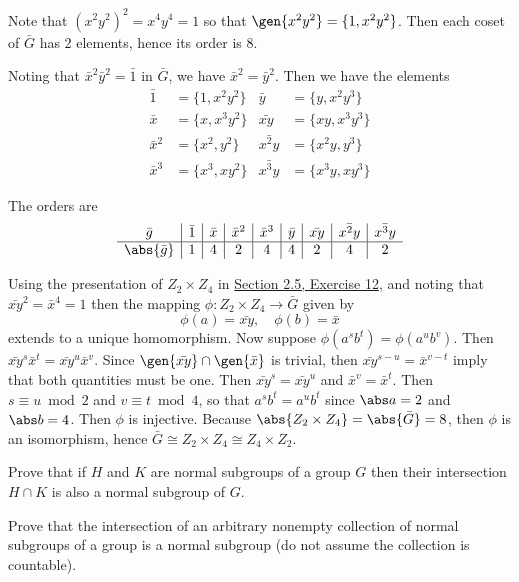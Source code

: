 \begin{solalph}
    \item Note that $(x^2y^2)^2 = x^4y^4 = 1$ so that $\gen{x^2y^2} = \{1, x^2y^2\}$. Then each coset of $\bar G$ has 2 elements, hence its order is 8.
    \item Noting that $\bar x^2 \bar y^2 = \bar 1$ in $\bar G$, we have $\bar x^2 = \bar y^2$. Then we have the elements
    \begin{align*}
        \bar 1 & = \{1, x^2y^2\} & \bar y & = \{y, x^2y^3\} \\
        \bar x & = \{x, x^3y^2\} & \bar{xy} & = \{xy, x^3y^3\} \\
        \bar x^2 & = \{x^2, y^2\} & \bar{x^2y} & = \{x^2y, y^3\} \\
        \bar x^3 & = \{x^3, xy^2\} & \bar{x^3y} & = \{x^3y, xy^3\}
    \end{align*}
    \item The orders are
    \[
    \begin{array}{c|c|c|c|c|c|c|c|c}
        \bar g & \bar 1 & \bar x & \bar x^2 & \bar x^3 & \bar y & \bar{xy} & \bar{x^2y} & \bar{x^3y} \\
        \hline
        \abs{\bar g} & 1 & 4 & 2 & 4 & 4 & 2 & 4 & 2
    \end{array}
    \]
    \item Using the presentation of $Z_2 \times Z_4$ in \hyperref[ex2.5.12]{Section 2.5, Exercise 12}, and noting that $\bar{xy}^2 = \bar x^4 = 1$ then the mapping $\phi : Z_2 \times Z_4 \to \bar G$ given by
    \[\phi(a) = \bar{xy}, \quad \phi(b) = \bar x\]
    extends to a unique homomorphism. Now suppose $\phi(a^sb^t) = \phi(a^ub^v)$. Then $\bar{xy}^s\bar x^t = \bar{xy}^u\bar x^v$. Since $\gen{\bar{xy}} \cap \gen{\bar x}$ is trivial, then $\bar{xy}^{s - u} = \bar x^{v - t}$ imply that both quantities must be one. Then $\bar{xy}^s = \bar{xy}^u$ and $\bar x^v = \bar x^t$. Then $s \equiv u \bmod 2$ and $v \equiv t \bmod 4$, so that $a^sb^t = a^ub^t$ since $\abs a = 2$ and $\abs b = 4$. Then $\phi$ is injective. Because $\abs{Z_2 \times Z_4} = \abs{\bar G} = 8$, then $\phi$ is an isomorphism, hence $\bar G \cong Z_2 \times Z_4 \cong Z_4 \times Z_2$.
\end{solalph}

\begin{exercise}\label{ex3.1.22}
    \begin{subproblems}
        \item Prove that if $H$ and $K$ are normal subgroups of a group $G$ then their intersection $H \cap K$ is also a normal subgroup of $G$.
        \item Prove that the intersection of an arbitrary nonempty collection of normal subgroups of a group is a normal subgroup (do not assume the collection is countable).
    \end{subproblems}
\end{exercise}


